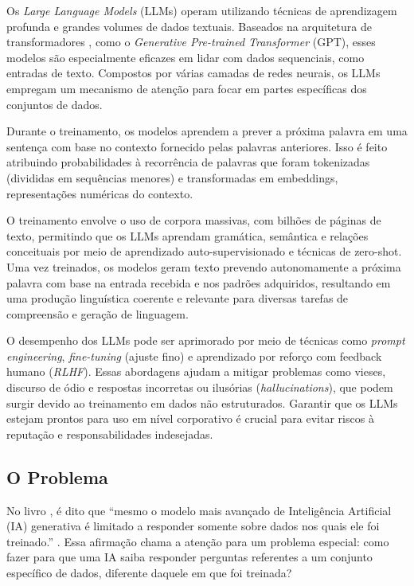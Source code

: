 \documentclass[a4paper, 12pt]{article}
\newcommand{\citeb}[1]{\bibleftbracket\cite{#1}\bibrightbracket}
\begin{document}
    Os \textit{Large Language Models} (LLMs) operam utilizando técnicas de aprendizagem profunda e grandes volumes de dados textuais. Baseados na arquitetura de transformadores \citeb{att_all_u_need}, como o \textit{Generative Pre-trained Transformer} (GPT), esses modelos são especialmente eficazes em lidar com dados sequenciais, como entradas de texto. Compostos por várias camadas de redes neurais, os LLMs empregam um mecanismo de atenção para focar em partes específicas dos conjuntos de dados.

    Durante o treinamento, os modelos aprendem a prever a próxima palavra em uma sentença com base no contexto fornecido pelas palavras anteriores. Isso é feito atribuindo probabilidades à recorrência de palavras que foram tokenizadas (divididas em sequências menores) e transformadas em embeddings, representações numéricas do contexto.

    O treinamento envolve o uso de corpora massivas, com bilhões de páginas de texto, permitindo que os LLMs aprendam gramática, semântica e relações conceituais por meio de aprendizado auto-supervisionado e técnicas de zero-shot. Uma vez treinados, os modelos geram texto prevendo autonomamente a próxima palavra com base na entrada recebida e nos padrões adquiridos, resultando em uma produção linguística coerente e relevante para diversas tarefas de compreensão e geração de linguagem.

    O desempenho dos LLMs pode ser aprimorado por meio de técnicas como \textit{prompt engineering}, \textit{fine-tuning} (ajuste fino) e aprendizado por reforço com feedback humano (\textit{RLHF}). Essas abordagens ajudam a mitigar problemas como vieses, discurso de ódio e respostas incorretas ou ilusórias (\textit{hallucinations}), que podem surgir devido ao treinamento em dados não estruturados. Garantir que os LLMs estejam prontos para uso em nível corporativo é crucial para evitar riscos à reputação e responsabilidades indesejadas.


    \subsection{O Problema}

    No livro , é dito que ``mesmo o modelo mais avançado de Inteligência Artificial (IA) generativa é limitado a responder somente sobre dados nos quais ele foi treinado.'' \citeb{rothman}. Essa afirmação chama a atenção para um problema especial: como fazer para que uma IA saiba responder perguntas referentes a um conjunto específico de dados, diferente daquele em que foi treinada?
\end{document}
